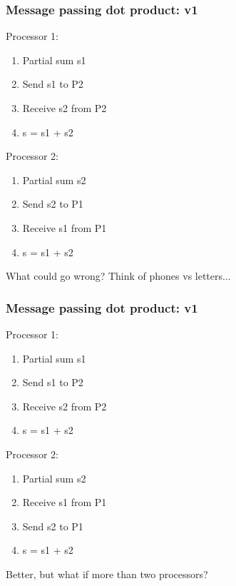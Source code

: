 \documentclass{beamer}
\begin{document}
\begin{frame}
  \frametitle{Message passing dot product: v1}

  \begin{minipage}{0.45\textwidth}
    Processor 1:
    \begin{enumerate}
    \item Partial sum s1
    \item Send s1 to P2
    \item Receive s2 from P2
    \item s = s1 + s2
    \end{enumerate}
  \end{minipage}
  \begin{minipage}{0.45\textwidth}
    Processor 2:
    \begin{enumerate}
    \item Partial sum s2
    \item Send s2 to P1
    \item Receive s1 from P1
    \item s = s1 + s2
    \end{enumerate}
  \end{minipage}

  \vspace{1cm}
  What could go wrong?  Think of phones vs letters...

\end{frame}


\begin{frame}
  \frametitle{Message passing dot product: v1}

  \begin{minipage}{0.45\textwidth}
    Processor 1:
    \begin{enumerate}
    \item Partial sum s1
    \item Send s1 to P2
    \item Receive s2 from P2
    \item s = s1 + s2
    \end{enumerate}
  \end{minipage}
  \begin{minipage}{0.45\textwidth}
    Processor 2:
    \begin{enumerate}
    \item Partial sum s2
    \item Receive s1 from P1
    \item Send s2 to P1
    \item s = s1 + s2
    \end{enumerate}
  \end{minipage}

  \vspace{1cm}
  Better, but what if more than two processors?

\end{frame}
\end{document}
